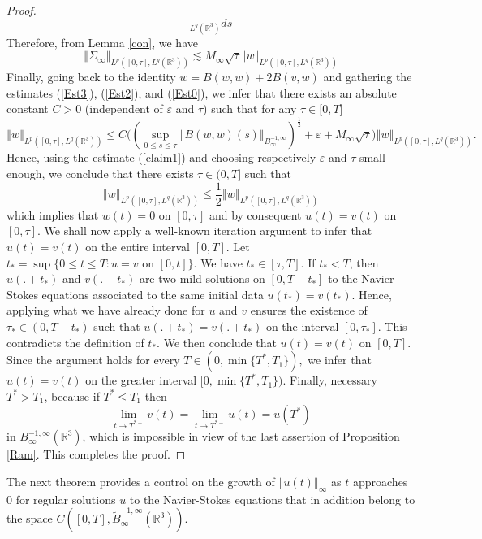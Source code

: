 \documentclass[11pt]{amsart}%
\theoremstyle{plain}
\numberwithin{equation}{section}
\begin{document}
\begin{proof}
\[_{L^{q}(\mathbb{R}^{3})}ds
\]
Therefore, from Lemma \ref{con}, we have
\begin{equation}\label{Est0}
\left\Vert \Sigma_{\infty }\right\Vert _{L^{p}([0,\tau ],L^{q}(\mathbb{R}^{3}))}\lesssim M_{\infty }\sqrt{\tau }\left\Vert w\right\Vert_{L^{p}([0,\tau ],L^{q}(\mathbb{R}^{3}))}
\end{equation}
Finally, going back to the identity $w=B(w,w)+2B(v,w)$ and gathering the
estimates (\ref{Est3}), (\ref{Est2}), and (\ref{Est0}), we infer that
there exists an absolute constant $C>0$ (independent of $\varepsilon $ and $%
\tau $) such that for any $\tau \in \lbrack 0,T]$%
\[
\left\Vert w\right\Vert _{L^{p}([0,\tau ],L^{q}(\mathbb{R}^{3}))}\leq
C\big((\sup_{0\leq s\leq \tau }\left\Vert B(w,w)(s)\right\Vert
_{B_{\infty }^{-1,\infty }})^\frac{1}{2}+\varepsilon +M_{\infty }\sqrt{\tau }\big) \left\Vert
w\right\Vert _{L^{p}([0,\tau ],L^{q}(\mathbb{R}^{3}))}.
\]%
Hence, using the estimate (\ref{claim1}) and  choosing respectively $\varepsilon $ and $\tau $ small enough, we conclude that there exists $\tau \in (0,T]$ such
that
\[
\left\Vert w\right\Vert _{L^{p}([0,\tau ],L^{q}(\mathbb{R}^{3}))}\leq \frac{1%
}{2}\left\Vert w\right\Vert _{L^{p}([0,\tau ],L^{q}(\mathbb{R}^{3}))}
\]%
which implies that $w(t)=0$ on $[0,\tau ]$ and by consequent $u(t)=v(t)$ on $%
[0,\tau ].$ We shall now apply a well-known iteration argument to infer that  $u(t)=v(t)$ on the entire interval $[0,T].$ Let $t_\ast=\sup\{0\leq t\leq T: u=v  \text{ on } [0,t]\}$. We have $t_\ast\in[\tau,T].$ If $t_\ast<T$, then $u(.+t_\ast)$ and $v(.+t_\ast)$ are two mild solutions on $[0,T-t_\ast]$ to the Navier-Stokes equations associated to the same initial data $u(t_\ast)=v(t_\ast)$. Hence, applying what we have already done for $u$ and $v$ ensures the existence of $\tau_\ast\in(0,T-t_\ast)$ such that $u(.+t_\ast)=v(.+t_\ast)$ on the interval $[0,\tau_\ast ]$. This contradicts the definition of $t_\ast$. We then conclude that $u(t)=v(t)$ on $[0,T]$. Since the argument holds for every  $ T\in (0,\min\{T^\ast,T_1\}),$ we infer  that $u(t)=v(t)$ on the greater interval $[0,\min\{T^\ast,T_1\}).$ Finally, necessary  $T^\ast> T_1$, because if $T^\ast\leq T_1$ then
$$\lim_{t\to T^{\ast -}}v(t)=\lim_{t\to T^{\ast -}}u(t)=u(T^\ast)$$
in $B^{-1,\infty}_\infty(\mathbb{R}^3)$, which is impossible in view of  the last assertion of Proposition \ref{Ram}. This completes  the proof.
\end{proof}
The next theorem provides a control on the growth of $\left\Vert u(t)\right\Vert_\infty$  as $t$ approaches $0$ for regular solutions $u$ to the  Navier-Stokes equations that in addition belong to  the space $C([0,T],\tilde{B}^{-1,\infty}_\infty(\mathbb{R}^3))$.
\end{document}

